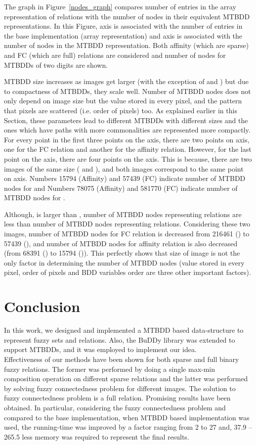 \documentclass[4pt]{article}
\begin{document}
The graph in Figure~\ref{nodes_graph} compares number of entries in the array representation of relations with the number of nodes in their equivalent MTBDD representations. In this Figure, axis  is associated with the number of entries in the base implementation (array representation) and axis  is associated with the number of nodes in the MTBDD representation. Both affinity (which are sparse) and FC (which are full) relations are considered and number of nodes for MTBDDs of two digits are shown.

MTBDD size increases as images get larger (with the exception of  and ) but due to compactness of MTBDDs, they scale well. Number of MTBDD nodes does not only depend on image size but the value stored in every pixel, and the pattern that pixels are scattered (i.e. order of pixels) too. As explained earlier in this Section, these parameters lead to different MTBDDs with different sizes and the ones which have paths with more commonalities are represented more compactly. For every point in the first three points on the  axis, there are two points on  axis, one for the FC relation and another for the affinity relation. However, for the last point on the  axis, there are four points on the  axis. This is because, there are two images of the same size ( and ), and both images correspond to the same point on  axis. Numbers 15794 (Affinity) and 57439 (FC) indicate number of MTBDD nodes for  and Numbers 78075 (Affinity) and 581770 (FC) indicate number of MTBDD nodes for .

Although,  is larger than , number of MTBDD nodes representing  relations are less than number of MTBDD nodes representing  relations. Considering these two images, number of MTBDD nodes for FC relation is decreased from 216461 () to 57439 (), and number of MTBDD nodes for affinity relation is also decreased (from 68391 () to 15794 ()). This perfectly shows that size of image is not the only factor in determining the number of MTBDD nodes (value stored in every pixel, order of pixels and BDD variables order are three other important factors).


\section*{Conclusion}
\label{conclusion}


In this work, we designed and implemented a MTBDD based data-structure to represent fuzzy sets and relations. Also, the BuDDy library was extended to support MTBDDs, and it was employed to implement our idea.\\
Effectiveness of our methods have been shown for both sparse and full binary fuzzy relations. The former was performed by doing a single max-min composition operation on different sparse relations and the latter was performed by solving fuzzy connectedness problem for different images. The solution to fuzzy connectedness problem is a full relation. Promising results have been obtained. In particular, considering the fuzzy connectedness problem and compared to the base implementation, when MTBDD based implementation was used, the running-time was improved by a factor ranging from 2 to 27 and, 37.9 -- 265.5 less memory was required to represent the final results.
\end{document}
